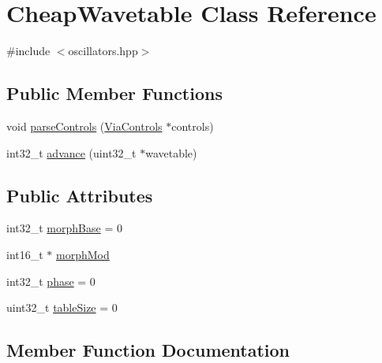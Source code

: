 \hypertarget{class_cheap_wavetable}{}\section{Cheap\+Wavetable Class Reference}
\label{class_cheap_wavetable}


{\ttfamily \#include $<$oscillators.\+hpp$>$}

\subsection*{Public Member Functions}
\begin{DoxyCompactItemize}
\item 
void \mbox{\hyperlink{class_cheap_wavetable_ae93cc1f2b00fdbc7f6b42b39213b9830}{parse\+Controls}} (\mbox{\hyperlink{class_via_controls}{Via\+Controls}} $\ast$controls)
\item 
int32\+\_\+t \mbox{\hyperlink{class_cheap_wavetable_aab1b12c33e9a6277fdf2f43c3ee6c644}{advance}} (uint32\+\_\+t $\ast$wavetable)
\end{DoxyCompactItemize}
\subsection*{Public Attributes}
\begin{DoxyCompactItemize}
\item 
int32\+\_\+t \mbox{\hyperlink{class_cheap_wavetable_a36112b34b09daac721ff911baef863b6}{morph\+Base}} = 0
\item 
int16\+\_\+t $\ast$ \mbox{\hyperlink{class_cheap_wavetable_afd56507343b52456f5e0045ef10758ca}{morph\+Mod}}
\item 
int32\+\_\+t \mbox{\hyperlink{class_cheap_wavetable_a3a71b0825ae52d4138f43565019749b0}{phase}} = 0
\item 
uint32\+\_\+t \mbox{\hyperlink{class_cheap_wavetable_ad2a8b3e71070f39921daec92e611769f}{table\+Size}} = 0
\end{DoxyCompactItemize}


\subsection{Member Function Documentation}
\mbox{\label{class_cheap_wavetable_aab1b12c33e9a6277fdf2f43c3ee6c644}} 
